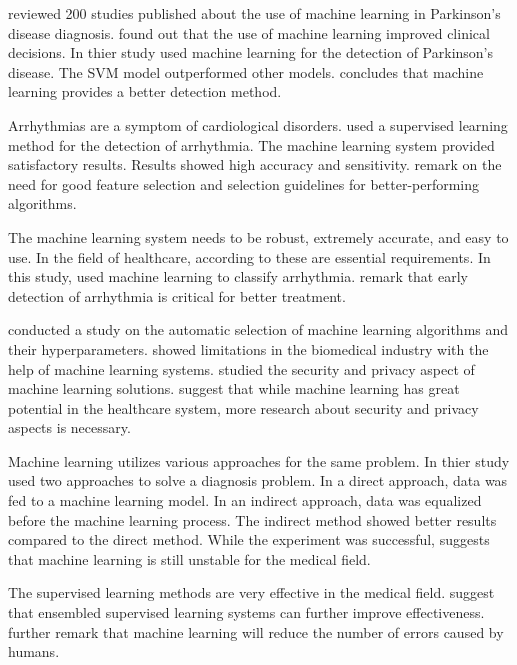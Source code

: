 \cite*{ref_paper_27} reviewed 200 studies published about the use of machine learning in Parkinson's disease diagnosis. \citeauthor{ref_paper_27} found out that the use of machine learning improved clinical decisions. In thier study \cite*{ref_paper_30} used machine learning for the detection of Parkinson's disease. The SVM model outperformed other models. \citeauthor{ref_paper_30} concludes that machine learning provides a better detection method.

Arrhythmias are a symptom of cardiological disorders. \cite*{ref_paper_28} used a supervised learning method for the detection of arrhythmia. The machine learning system provided satisfactory results. Results showed high accuracy and sensitivity. \citeauthor{ref_paper_28} remark on the need for good feature selection and selection guidelines for better-performing algorithms.

The machine learning system needs to be robust, extremely accurate, and easy to use. In the field of healthcare, according to \cite*{ref_paper_4} these are essential requirements. In this study, \citeauthor{ref_paper_4} used machine learning to classify arrhythmia. \citeauthor{ref_paper_4} remark that early detection of arrhythmia is critical for better treatment.

\cite*{ref_paper_32} conducted a study on the automatic selection of machine learning algorithms and their hyperparameters. \citeauthor{ref_paper_32} showed limitations in the biomedical industry with the help of machine learning systems. \cite*{ref_paper_37} studied the security and privacy aspect of machine learning solutions. \citeauthor{ref_paper_37} suggest that while machine learning has great potential in the healthcare system, more research about security and privacy aspects is necessary.

Machine learning utilizes various approaches for the same problem. In thier study \cite*{ref_paper_8} used two approaches to solve a diagnosis problem. In a direct approach, data was fed to a machine learning model. In an indirect approach, data was equalized before the machine learning process. The indirect method showed better results compared to the direct method. While the experiment was successful, \citeauthor{ref_paper_8} suggests that machine learning is still unstable for the medical field.

The supervised learning methods are very effective in the medical field. \cite*{ref_paper_11} suggest that ensembled supervised learning systems can further improve effectiveness. \citeauthor{ref_paper_11} further remark that machine learning will reduce the number of errors caused by humans.

